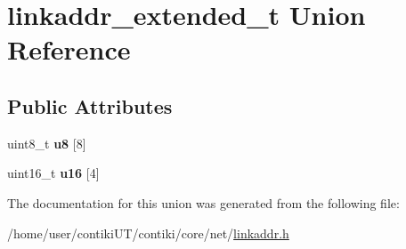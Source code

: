 \hypertarget{unionlinkaddr__extended__t}{}\section{linkaddr\+\_\+extended\+\_\+t Union Reference}
\label{unionlinkaddr__extended__t}
\subsection*{Public Attributes}
\begin{DoxyCompactItemize}
\item 
\hypertarget{unionlinkaddr__extended__t_ac9eaf29faf23ca6841c31e1109ffba85}{}uint8\+\_\+t {\bfseries u8} \mbox{[}8\mbox{]}\label{unionlinkaddr__extended__t_ac9eaf29faf23ca6841c31e1109ffba85}

\item 
\hypertarget{unionlinkaddr__extended__t_af3559b16b0358c4e634d0da1116207fc}{}uint16\+\_\+t {\bfseries u16} \mbox{[}4\mbox{]}\label{unionlinkaddr__extended__t_af3559b16b0358c4e634d0da1116207fc}

\end{DoxyCompactItemize}


The documentation for this union was generated from the following file\+:\begin{DoxyCompactItemize}
\item 
/home/user/contiki\+U\+T/contiki/core/net/\hyperlink{linkaddr_8h}{linkaddr.\+h}\end{DoxyCompactItemize}
